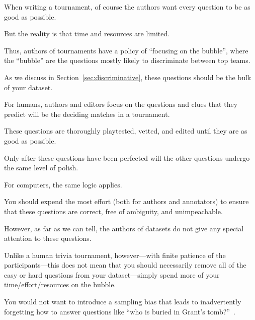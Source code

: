 When writing a tournament, of course the authors want every question to be as good as possible.

But the reality is that time and resources are limited.  

Thus, authors of tournaments have a policy of ``focusing on the bubble'', where the ``bubble'' are the questions mostly likely to discriminate between top teams.

As we discuss in Section~\ref{sec:discriminative}, these questions should be the bulk of your dataset.

For humans, authors and editors focus on the questions and clues that they predict will be the deciding matches in a tournament.

These questions are thoroughly playtested, vetted, and edited until they are as good as possible.

Only after these questions have been perfected will the other questions undergo the same level of polish.

For computers, the same logic applies.  

You should expend the most effort (both for authors and annotators) to ensure that these questions are correct, free of ambiguity, and unimpeachable.

However, as far as we can tell, the authors of \qa{} datasets do not give any special attention to these questions.

Unlike a human trivia tournament, however---with finite patience of the participants---this does not mean that you should necessarily remove all of the easy or hard questions from your dataset---simply spend more of your time/effort/resources on the bubble.

You would not want to introduce a sampling bias that leads to inadvertently forgetting how to answer questions like ``who is buried in Grant's tomb?''~\cite[Chapter 7]{dwan-00}.
